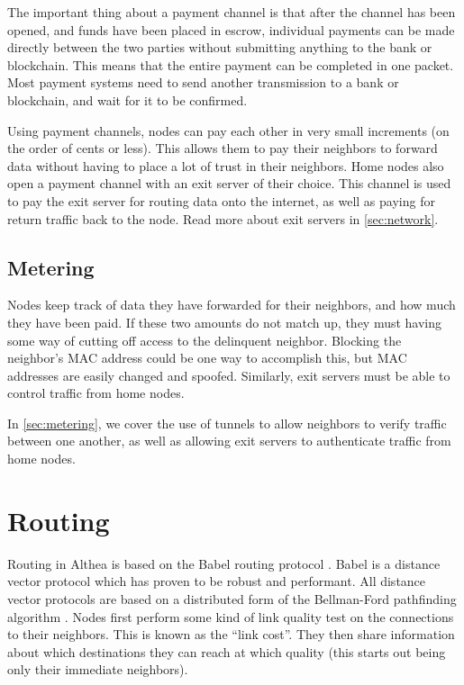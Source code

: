 \documentclass[11pt]{article}
\begin{document}
The important thing about a payment channel is that after the channel has been opened, and funds have been placed in escrow, individual payments can be made directly between the two parties without submitting anything to the bank or blockchain. This means that the entire payment can be completed in one packet. Most payment systems need to send another transmission to a bank or blockchain, and wait for it to be confirmed. 
 
Using payment channels, nodes can pay each other in very small increments (on the order of cents or less). This allows them to pay their neighbors to forward data without having to place a lot of trust in their neighbors. Home nodes also open a payment channel with an exit server of their choice. This channel is used to pay the exit server for routing data onto the internet, as well as paying for return traffic back to the node. Read more about exit servers in \autoref{sec:network}.

\subsection{Metering}
Nodes keep track of data they have forwarded for their neighbors, and how much they have been paid. If these two amounts do not match up, they must having some way of cutting off access to the delinquent neighbor. Blocking the neighbor’s MAC address could be one way to accomplish this, but MAC addresses are easily changed and spoofed. Similarly, exit servers must be able to control traffic from home nodes.
 
In \autoref{sec:metering}, we cover the use of tunnels to allow neighbors to verify traffic between one another, as well as allowing exit servers to authenticate traffic from home nodes.

\section{Routing}
\label{sec:routing}
Routing in Althea is based on the Babel routing protocol \cite{babel}. Babel is a distance vector protocol which has proven to be robust and performant. All distance vector protocols are based on a distributed form of the Bellman-Ford pathfinding algorithm \cite{bellmanford}. Nodes first perform some kind of link quality test on the connections to their neighbors. This is known as the ``link cost''. They then share information about which destinations they can reach at which quality (this starts out being only their immediate neighbors).
 
\end{document}
